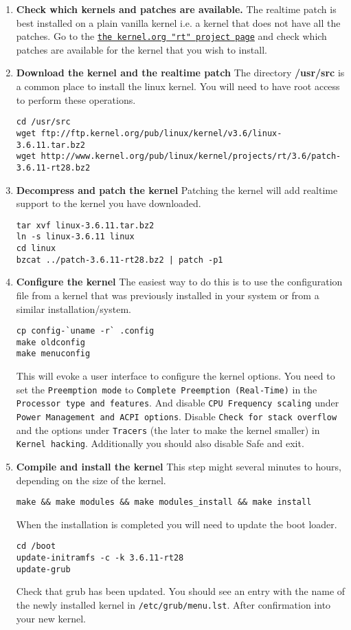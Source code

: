 \begin{enumerate}
	\item \textbf{Check which kernels and patches are available.} The realtime patch is best installed on a plain vanilla kernel i.e. a kernel that does not have all the patches.
Go to the \texttt{\href{http://www.kernel.org/pub/linux/kernel/projects/rt/}{the kernel.org "rt" project page}} and check which patches are available for the kernel that you wish to install. 

	\item \textbf{Download the kernel and the realtime patch} The directory \textbf{/usr/src} is a common place to install the linux kernel. You will need to have root access to perform these operations.
\begin{lstlisting}
cd /usr/src
wget ftp://ftp.kernel.org/pub/linux/kernel/v3.6/linux-3.6.11.tar.bz2 
wget http://www.kernel.org/pub/linux/kernel/projects/rt/3.6/patch-3.6.11-rt28.bz2
\end{lstlisting}

\item \textbf{Decompress and patch the kernel} Patching the kernel will add realtime support to the kernel you have downloaded.
\begin{lstlisting}
tar xvf linux-3.6.11.tar.bz2
ln -s linux-3.6.11 linux
cd linux
bzcat ../patch-3.6.11-rt28.bz2 | patch -p1
\end{lstlisting}

\item \textbf{Configure the kernel} The easiest way to do this is to use the configuration file from a kernel that was previously installed in your system or from a similar installation/system.
\begin{lstlisting}
cp config-`uname -r` .config
make oldconfig
make menuconfig
\end{lstlisting}
This will evoke a user interface to configure the kernel options.
You need to set the \texttt{Preemption mode} to \texttt{Complete Preemption (Real-Time)} in the \texttt{Processor type and features}. And disable \texttt{CPU Frequency scaling} under \texttt{Power Management and ACPI options}. Disable \texttt{Check for stack overflow} and the options under \texttt{Tracers} (the later to make the kernel smaller) in \texttt{Kernel hacking}. Additionally you should also disable 
Safe and exit.

\item \textbf{Compile and install the kernel} This step might several minutes to hours, depending on the size of the kernel.
\begin{lstlisting}
make && make modules && make modules_install && make install
\end{lstlisting}
When the installation is completed you will need to update the boot loader.
\begin{lstlisting}
cd /boot
update-initramfs -c -k 3.6.11-rt28
update-grub
\end{lstlisting}
Check that grub has been updated. You should see an entry with the name of the newly installed kernel in \texttt{/etc/grub/menu.lst}. After confirmation  into your new kernel.
\end{enumerate}

